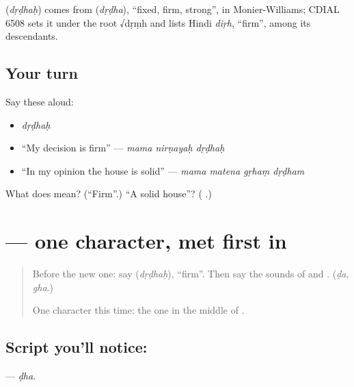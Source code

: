 \begin{cousinweb}
\textbf{} (\emph{dṛḍhaḥ}) comes from \textbf{} (\emph{dṛḍha}), \textquotedblleft{}fixed, firm, strong\textquotedblright{}, in Monier-Williams; CDIAL 6508 sets it under the root √dṛṃh and lists Hindi \emph{diṛh}, \textquotedblleft{}firm\textquotedblright{}, among its descendants.
\end{cousinweb}

\subsection*{Your turn}
Say these aloud:

\begin{itemize}
\raggedright
  \item \emph{dṛḍhaḥ}
  \item \textquotedblleft{}My decision is firm\textquotedblright{} — \emph{mama nirṇayaḥ dṛḍhaḥ}
  \item \textquotedblleft{}In my opinion the house is solid\textquotedblright{} — \emph{mama matena gṛhaṃ dṛḍham}
\end{itemize}

\begin{tcolorbox}[breakable,colback=teal!4,colframe=teal!35!black,title={Before you move on}]
What does \textbf{} mean? (\textquotedblleft{}Firm\textquotedblright{}.) \textquotedblleft{}A solid house\textquotedblright{}? (\textbf{ }.)
\end{tcolorbox}
\section[\texorpdfstring{\sk{ढ} (ḍha)}{ढ (ḍha)}]{ — one character, met first in }

\label{lesson:SA-S227-letter-ddha}



\begin{quote}
Before the new one: say \textbf{} (\emph{dṛḍhaḥ}), \textquotedblleft{}firm\textquotedblright{}. Then say the sounds of \textbf{} and \textbf{}. (\emph{ḍa}, \emph{gha}.)

One character this time: the one in the middle of \textbf{}.
\end{quote}

\subsection*{Script you'll notice: }
\textbf{} — \emph{ḍha}.

